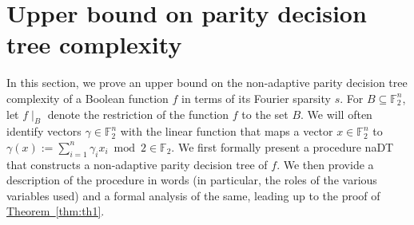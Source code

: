\documentclass{toc}
\newcommand{\lref}[2][]{\hyperref[#2]{#1~\ref*{#2}}}
\newcommand{\F}{{\mathbb F}}
\begin{document}
\section{Upper bound on parity decision tree complexity} %
\label{themain}
In this section, we %
prove an upper bound on the non-adaptive parity decision tree
complexity of a Boolean function $f$ in terms of its Fourier sparsity $s$. For $B \subseteq \F_2^n$, let $f \mid_B$ denote the restriction of the function $f$ to the set $B$. We will often identify vectors $\gamma \in \F_2^n$ with the linear function that maps a vector $x \in \F_2^n$ to $\gamma(x):=\sum_{i=1}^n \gamma_ix_i \bmod 2 \in \F_2$. We first formally present a procedure {\sc naDT} that constructs a non-adaptive
parity decision tree of $f$. We then provide a description of the procedure in words (in particular, the roles of the various variables used) and a formal analysis of the same, leading up to the proof of \lref[Theorem]{thm:th1}.
\end{document}

